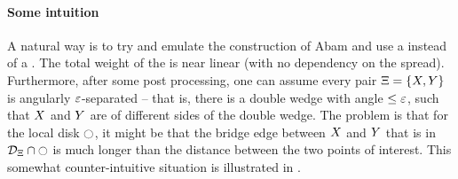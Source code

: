 \documentclass[12pt]{article}%
\begin{document}
\paragraph{Some intuition}
A natural way is to try and emulate the construction of Abam \etal
\cite{abfg-rftgs-09} and use a \SSPD instead of a \WSPD. The total
weight of the \SSPD is near linear (with no dependency on the
spread). Furthermore, after some post processing, one can assume every
pair $\Xi = \{ X, Y \}$ is angularly $\varepsilon$-separated -- that
is, there is a double wedge with angle $\leq \varepsilon$, such that $X$
and $Y$ are of different sides of the double wedge. The problem is
that for the local disk $\ocircle$, it might be that the bridge edge
between $X$ and $Y$ that is in $\mathcal{D}_\Xi \cap \ocircle$ is much
longer than the distance between the two points of interest. This
somewhat counter-intuitive situation is illustrated in .
\end{document}

